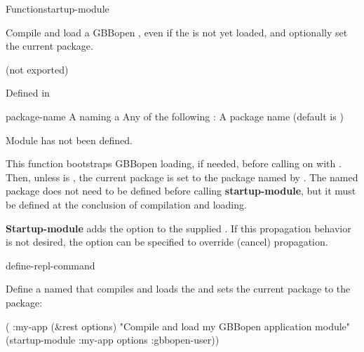 \documentclass[10pt,twoside,english,pdftex]{article}
\begin{document}
\begin{functiondoc}{Function}{startup-module}%
  {}
%
% 
%
%
%
%
%

\fnsyntax 

\fnpurpose Compile and load a GBBopen , even if the
is not yet loaded, and optionally
set the current package.

\fnpackage {} (not exported)

\fnmodule Defined in 

\fnargs
\begin{args}{package-name}
 A  naming a 
\arg[option] Any of the following : 
\compilemoduleoptions
{} A package name (default is \nil)
\end{args}

\fnerrors Module  has not been defined.\\
\relativedircircularity

\fndescription This function bootstraps GBBopen loading, if needed, before
calling \textbf{} on  with
.  Then, unless  is \nil, the current package
is set to the package named by .  The named package does not
need to be defined before calling \textbf{startup-module}, but it must be
defined at the conclusion of  compilation and loading.

%
%
%
\textbf{Startup-module} adds the option  to the supplied
.  If this propagation behavior is not desired, the
 option can be specified to override (cancel) propagation.

\begin{alsos}{define-repl-command}
\end{alsos}

\fnexample
%
Define a  named  that compiles and loads the
  and sets the current package to the
 package:
%
\W\supp
\begin{example}
  ( :my-app (&rest options)
    "Compile and load my GBBopen application module"
    (startup-module :my-app options :gbbopen-user))
\end{example} 

\end{functiondoc}
\end{document}
